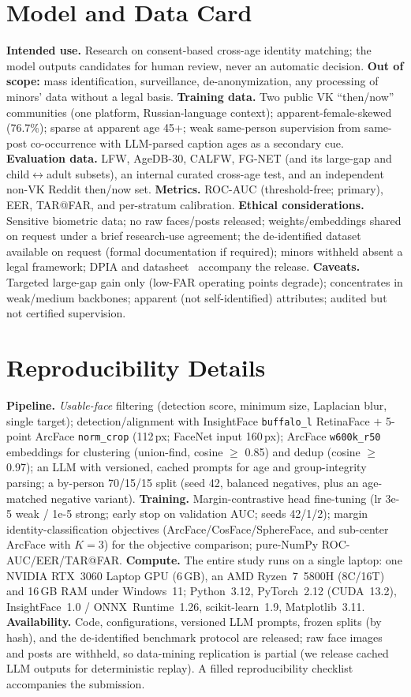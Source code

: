 \documentclass[letterpaper]{article} %
\begin{document}
\section{Model and Data Card}\label{sup:card}
\textbf{Intended use.} Research on consent-based cross-age identity matching; the model outputs candidates for human review, never an automatic decision. \textbf{Out of scope:} mass identification, surveillance, de-anonymization, any processing of minors' data without a legal basis. \textbf{Training data.} Two public VK ``then/now'' communities (one platform, Russian-language context); apparent-female-skewed (76.7\%); sparse at apparent age 45+; weak same-person supervision from same-post co-occurrence with LLM-parsed caption ages as a secondary cue. \textbf{Evaluation data.} LFW, AgeDB-30, CALFW, FG-NET (and its large-gap and child$\leftrightarrow$adult subsets), an internal curated cross-age test, and an independent non-VK Reddit then/now set. \textbf{Metrics.} ROC-AUC (threshold-free; primary), EER, TAR@FAR, and per-stratum calibration. \textbf{Ethical considerations.} Sensitive biometric data; no raw faces/posts released; weights/embeddings shared on request under a brief research-use agreement; the de-identified dataset available on request (formal documentation if required); minors withheld absent a legal framework; DPIA and datasheet~\cite{gebru2021datasheets} accompany the release. \textbf{Caveats.} Targeted large-gap gain only (low-FAR operating points degrade); concentrates in weak/medium backbones; apparent (not self-identified) attributes; audited but not certified supervision.

\section{Reproducibility Details}\label{sup:repro}
\textbf{Pipeline.} \emph{Usable-face} filtering (detection score, minimum size, Laplacian blur, single target); detection/alignment with InsightFace \texttt{buffalo\_l} RetinaFace $+$ 5-point ArcFace \texttt{norm\_crop} (112\,px; FaceNet input 160\,px); ArcFace \texttt{w600k\_r50} embeddings for clustering (union-find, cosine $\geq$ 0.85) and dedup (cosine $\geq$ 0.97); an LLM with versioned, cached prompts for age and group-integrity parsing; a by-person 70/15/15 split (seed 42, balanced negatives, plus an age-matched negative variant). \textbf{Training.} Margin-contrastive head fine-tuning (lr 3e-5 weak / 1e-5 strong; early stop on validation AUC; seeds 42/1/2); margin identity-classification objectives (ArcFace/CosFace/SphereFace, and sub-center ArcFace with $K{=}3$) for the objective comparison; pure-NumPy ROC-AUC/EER/TAR@FAR. \textbf{Compute.} The entire study runs on a single laptop: one NVIDIA RTX~3060 Laptop GPU (6\,GB), an AMD Ryzen~7~5800H (8C/16T) and 16\,GB RAM under Windows~11; Python~3.12, PyTorch~2.12 (CUDA~13.2), InsightFace~1.0 / ONNX~Runtime~1.26, scikit-learn~1.9, Matplotlib~3.11. \textbf{Availability.} Code, configurations, versioned LLM prompts, frozen splits (by hash), and the de-identified benchmark protocol are released; raw face images and posts are withheld, so data-mining replication is partial (we release cached LLM outputs for deterministic replay). A filled reproducibility checklist accompanies the submission.


\end{document}
